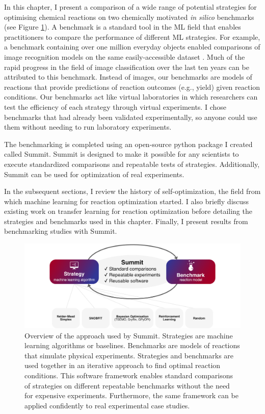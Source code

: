 In this chapter, I present a comparison of a wide range of potential strategies for optimising chemical reactions on two chemically motivated \emph{in silico} benchmarks (see Figure \ref{fig:overview}). A benchmark is a standard tool in the ML field that enables practitioners to compare the performance of different ML strategies. For example, a benchmark containing over one million everyday objects enabled comparisons of image recognition models on the same easily-accessible dataset \cite{Russakovsky2015}. Much of the rapid progress in the field of image classification over the last ten years can be attributed to this benchmark. Instead of images, our benchmarks are models of reactions that provide predictions of reaction outcomes (e.g., yield) given reaction conditions. Our benchmarks act like virtual laboratories in which researchers can test the efficiency of each strategy through virtual experiments. I chose benchmarks that had already been validated experimentally, so anyone could use them without needing to run laboratory experiments. 

The benchmarking is completed using an open-source python package I created called Summit. Summit is designed to make it possible for any scientists to execute standardized comparisons and repeatable tests of strategies. Additionally, Summit can be used for optimization of real experiments.

In the subsequent sections, I review the history of self-optimization, the field from which machine learning for reaction optimization started. I also briefly discuss existing work on transfer learning for reaction optimization before detailing the strategies and benchmarks used in this chapter. Finally, I present results from benchmarking studies with Summit.

\begin{figure}
    \centering
    \includegraphics[width=\textwidth]{gfx/Chapter03/overview.png}
    \caption{Overview of the approach used by Summit. Strategies are machine learning algorithms or baselines. Benchmarks are models of reactions that simulate physical experiments. Strategies and benchmarks are used together in an iterative approach to find optimal reaction conditions. This software framework enables standard comparisons of strategies on different repeatable benchmarks without the need for expensive experiments. Furthermore, the same framework can be applied confidently to real experimental case studies.}
    \label{fig:overview}
\end{figure}

